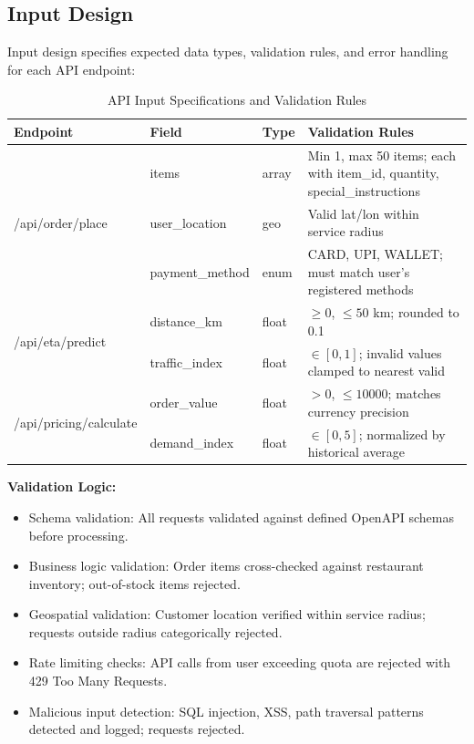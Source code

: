 \documentclass[12pt,a4paper]{report}
\begin{document}
\begin{itemize}
\section{Input Design}

Input design specifies expected data types, validation rules, and error handling for each API endpoint:

\begin{table}[H]
\centering
\caption{API Input Specifications and Validation Rules}
\begin{tabular}{p{2.5cm} p{2cm} p{2.5cm} p{3cm}}
\toprule
\textbf{Endpoint} & \textbf{Field} & \textbf{Type} & \textbf{Validation Rules} \\
\midrule
\multirow{3}{*}{/api/order/place} & items & array & Min 1, max 50 items; each with item_id, quantity, special_instructions \\
& user_location & geo & Valid lat/lon within service radius \\
& payment_method & enum & CARD, UPI, WALLET; must match user's registered methods \\
\multirow{2}{*}{/api/eta/predict} & distance_km & float & $\ge 0$, $ \le 50$ km; rounded to 0.1 \\
& traffic_index & float & $\in [0, 1]$; invalid values clamped to nearest valid \\
\multirow{2}{*}{/api/pricing/calculate} & order_value & float & $> 0$, $\le 10000$; matches currency precision \\
& demand_index & float & $\in [0, 5]$; normalized by historical average \\
\bottomrule
\end{tabular}
\end{table}

\textbf{Validation Logic:}
\begin{itemize}
    \item Schema validation: All requests validated against defined OpenAPI schemas before processing.
    \item Business logic validation: Order items cross-checked against restaurant inventory; out-of-stock items rejected.
    \item Geospatial validation: Customer location verified within service radius; requests outside radius categorically rejected.
    \item Rate limiting checks: API calls from user exceeding quota are rejected with 429 Too Many Requests.
    \item Malicious input detection: SQL injection, XSS, path traversal patterns detected and logged; requests rejected.
\end{itemize}


\end{itemize}
\end{document}
